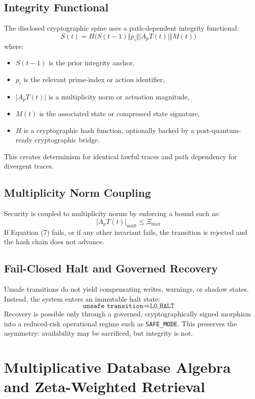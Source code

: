 \documentclass[11pt]{article}
\begin{document}
\subsection{Integrity Functional}
The disclosed cryptographic spine uses a path-dependent integrity functional:
\[
S(t) = H\Big(S(t-1) \Vert p_i \Vert \lvert A_p T(t) \rvert \Vert M(t)\Big) \tag{6}
\]
where:
\begin{itemize}[leftmargin=1cm]
  \item \(S(t-1)\) is the prior integrity anchor,
  \item \(p_i\) is the relevant prime-index or action identifier,
  \item \(\lvert A_p T(t) \rvert\) is a multiplicity norm or actuation magnitude,
  \item \(M(t)\) is the associated state or compressed state signature,
  \item \(H\) is a cryptographic hash function, optionally backed by a post-quantum-ready cryptographic bridge.
\end{itemize}

This creates determinism for identical lawful traces and path dependency for divergent traces.

\subsection{Multiplicity Norm Coupling}
Security is coupled to multiplicity norms by enforcing a bound such as:
\[
\lvert A_p T(t) \rvert_{\mathrm{mult}} \le \Xi_{\max} \tag{7}
\]
If Equation (7) fails, or if any other invariant fails, the transition is rejected and the hash chain does not advance.

\subsection{Fail-Closed Halt and Governed Recovery}
Unsafe transitions do not yield compensating writes, warnings, or shadow states. Instead, the system enters an immutable halt state:
\[
\texttt{unsafe transition} \Rightarrow \texttt{L0\_HALT} \tag{8}
\]
Recovery is possible only through a governed, cryptographically signed morphism into a reduced-risk operational regime such as \texttt{SAFE\_MODE}. This preserves the asymmetry: availability may be sacrificed, but integrity is not.
\newpage
\section{Multiplicative Database Algebra and Zeta-Weighted Retrieval}
\end{document}
